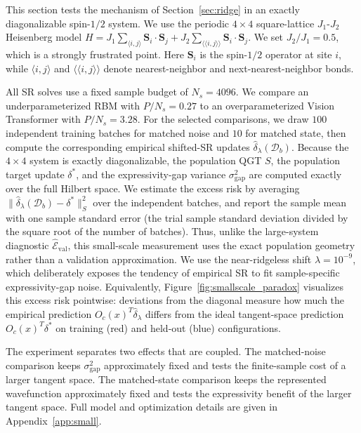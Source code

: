 \documentclass{article}
\begin{document}
This section tests the mechanism of Section~\ref{sec:ridge} in an exactly
diagonalizable spin-$1/2$ system. We use the periodic $4\times4$ square-lattice
$J_1$-$J_2$ Heisenberg model
$
    H
    =
    J_1\sum_{\langle i,j\rangle}\mathbf S_i\cdot\mathbf S_j
    +
    J_2\sum_{\langle\!\langle i,j\rangle\!\rangle}
    \mathbf S_i\cdot\mathbf S_j .
$
We set $J_2/J_1=0.5$, which is a strongly frustrated point. Here $\mathbf S_i$ is the spin-$1/2$ operator at site $i$, while
$\langle i,j\rangle$ and $\langle\!\langle i,j\rangle\!\rangle$ denote
nearest-neighbor and next-nearest-neighbor bonds.

All SR solves use a fixed sample budget of $N_s=4096$. We compare an
underparameterized RBM with $P/N_s=0.27$ to an overparameterized Vision
Transformer with $P/N_s=3.28$. For the selected comparisons, we draw $100$
independent training batches for matched noise and $10$ for matched state,
then compute the corresponding empirical shifted-SR updates
$\hat\delta_\lambda(\mathcal D_b)$. Because the $4\times4$ system is exactly
diagonalizable, the population QGT $S$, the population target update
$\delta^*$, and the expressivity-gap variance $\sigma_{\mathrm{gap}}^2$ are
computed exactly over the full Hilbert space. We estimate the excess risk by
averaging $\|\hat\delta_\lambda(\mathcal D_b)-\delta^*\|_S^2$ over the
independent batches, and report the sample mean with one sample standard error
(the trial sample standard deviation divided by the square root of the number
of batches). Thus, unlike the
large-system diagnostic $\widehat{\mathcal E}_{\mathrm{val}}$, this small-scale
measurement uses the exact population geometry rather than a validation
approximation. We use the near-ridgeless shift
$\lambda=10^{-9}$, which deliberately exposes the tendency of empirical SR to
fit sample-specific expressivity-gap noise.
Equivalently, Figure~\ref{fig:smallscale_paradox} visualizes this excess risk
pointwise: deviations from the diagonal measure how much the empirical
prediction $O_c(x)^T\hat\delta_\lambda$ differs from the ideal tangent-space
prediction $O_c(x)^T\delta^*$ on training (red) and held-out (blue) configurations.

The experiment separates two effects that are coupled.
The matched-noise comparison keeps $\sigma_{\mathrm{gap}}^2$ approximately fixed
and tests the finite-sample cost of a larger tangent space. The matched-state
comparison keeps the represented wavefunction approximately fixed and tests the
expressivity benefit of the larger tangent space. Full model and optimization
details are given in Appendix~\ref{app:small}.
\end{document}
